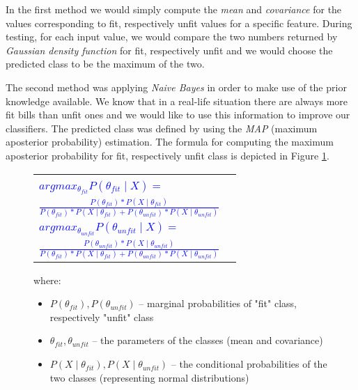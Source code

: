 \documentclass[11pt,twocolumn]{article}
\begin{document}
			In the first method we would simply compute the \emph{mean} and \emph{covariance} for the values corresponding to fit, respectively unfit values for a specific feature. During testing, for each input value, we would compare the two numbers returned by \emph{Gaussian density function} for fit, respectively unfit and we would choose the predicted class to be the maximum of the two.

			The second method was applying \emph{Naive Bayes} in order to make use of the prior knowledge available. We know that in a real-life situation there are always more fit bills than unfit ones and we would like to use this information to improve our classifiers. The predicted class was defined by using the \emph{MAP} (maximum aposterior probability) estimation. The formula for computing the maximum aposterior probability for fit, respectively unfit class is depicted in Figure \ref{MAP_formula}.

			\begin{figure}[!hbtp] \selectfont\small
				\caption{}
				\begin{tabular}{|lr|} \hline
					&\\[5pt]
					\textcolor{blue}{$argmax_{\theta_{fit}}P(\theta_{fit}\mid X) = $} &\\[5pt]
					\hspace*{50px}\textcolor{blue}{$\frac{P(\theta_{fit})*P(X\mid \theta_{fit})}{P(\theta_{fit})*P(X\mid \theta_{fit}) + P(\theta_{unfit})*P(X\mid \theta_{unfit})}$} &\\[15pt]
					\textcolor{blue}{$argmax_{\theta_{unfit}}P(\theta_{unfit}\mid X) = $} &\\[5pt]
					\hspace*{50px}\textcolor{blue}{$\frac{P(\theta_{unfit})*P(X\mid \theta_{unfit})}{P(\theta_{fit})*P(X\mid \theta_{fit}) + P(\theta_{unfit})*P(X\mid \theta_{unfit})}$} &\\[10pt]
			\hline
			\end{tabular}
					where: 
					\begin{itemize}
					\item $P(\theta_{fit}), P(\theta_{unfit})$ -- marginal probabilities of
						"fit" class, respectively "unfit" class
					\item $\theta_{fit}, \theta_{unfit}$ -- the parameters of the classes (mean
						and covariance)
					\item $P(X\mid \theta_{fit}),P(X\mid \theta_{unfit})$ -- the conditional
						probabilities of the two classes (representing normal distributions)
					\end{itemize} 
			\label{MAP_formula}
			\end{figure}
\end{document}
